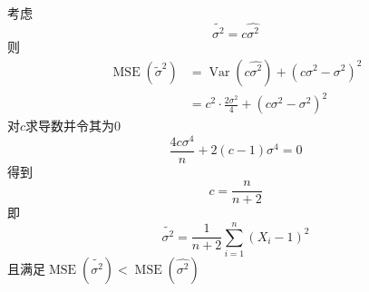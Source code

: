 \documentclass[UTF8]{ctexart}
\begin{document}
考虑
\[
\tilde{\sigma^2}=c\hat{\sigma^2}
\]
则
\[
\begin{aligned}
	\operatorname{MSE}\left(\widetilde{\sigma}^2\right) & =\operatorname{Var}\left(c \hat{\sigma^2}
	\right)+\left(c \sigma^2-\sigma^2\right)^2 \\
	& =c^2 \cdot \frac{2 \sigma^2}{4}+\left(c \sigma^2-\sigma^2\right)^2
\end{aligned}
\]
对$c$求导数并令其为0
\[
\frac{4 c \sigma^4}{n}+2(c-1) \sigma^4=0
\]
得到
\[
c=\frac{n}{n+2}
\]
即
\[
\tilde{\sigma^2}=\frac{1}{n+2} \sum_{i=1}^n\left(X_i-1\right)^2 
\]
且满足$\operatorname{MSE}\left(\tilde{\sigma^2}\right)<\operatorname{MSE}\left(\hat{\sigma^2}\right)$\\
\end{document}
